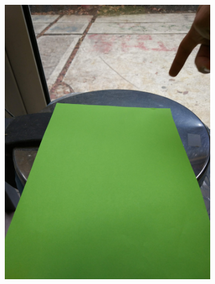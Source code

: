 \documentclass[a4paper,12pt]{article}
\begin{document}
\begin{appendices}
\begin{figure}[H]
\begin{subfigure}{.5\textwidth}
		\includegraphics[width=.98\textwidth]{2}
	\end{subfigure}%
	\begin{subfigure}{.5\textwidth}
		\centering

\end{subfigure}
\end{figure}
\end{appendices}
\end{document}
